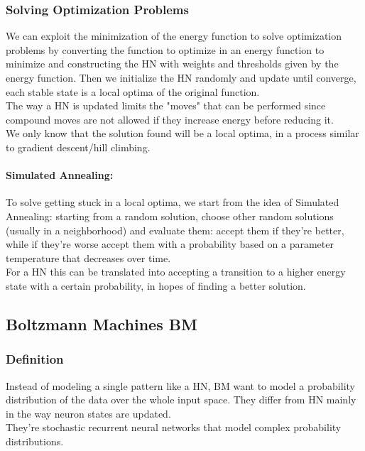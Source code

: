 \subsubsection{Solving Optimization Problems}
We can exploit the minimization of the energy function to solve optimization problems by converting the function to optimize in an energy function to minimize and constructing the HN with weights and thresholds given by the energy function. Then we initialize the HN randomly and update until converge, each stable state is a local optima of the original function.\\

The way a HN is updated limits the "moves" that can be performed since compound moves are not allowed if they increase energy before reducing it.\\
We only know that the solution found will be a local optima, in a process similar to gradient descent/hill climbing.\\

\paragraph{Simulated Annealing:} To solve getting stuck in a local optima, we start from the idea of Simulated Annealing: starting from a random solution, choose other random solutions (usually in a neighborhood) and evaluate them: accept them if they're better, while if they're worse accept them with a probability based on a parameter temperature that decreases over time.\\

For a HN this can be translated into accepting a transition to a higher energy state with a certain probability, in hopes of finding a better solution.\\

\subsection{Boltzmann Machines BM}

\subsubsection{Definition}
Instead of modeling a single pattern like a HN, BM want to model a probability distribution of the data over the whole input space. They differ from HN mainly in the way neuron states are updated.\\
They're stochastic recurrent neural networks that model complex probability distributions.\\

